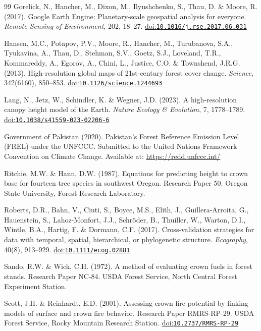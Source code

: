 \documentclass[12pt,a4paper,twoside]{article}
\makeatletter
\providecommand{\doi}[1]{%
  \begingroup
  \let\bibinfo\@secondoftwo
  \urlstyle{rm}%
  \href{https://doi.org/#1}{doi:\nolinkurl{#1}}%
  \endgroup
}
\makeatother
\begin{document}
\begin{thebibliography}{99}
Gorelick, N., Hancher, M., Dixon, M., Ilyushchenko, S., Thau, D. \& Moore, R.
  (2017).
\newblock Google Earth Engine: Planetary-scale geospatial analysis for everyone.
\newblock \textit{Remote Sensing of Environment}, 202, 18--27.
\newblock \doi{10.1016/j.rse.2017.06.031}

Hansen, M.C., Potapov, P.V., Moore, R., Hancher, M., Turubanova, S.A.,
  Tyukavina, A., Thau, D., Stehman, S.V., Goetz, S.J., Loveland, T.R.,
  Kommareddy, A., Egorov, A., Chini, L., Justice, C.O. \& Townshend, J.R.G.
  (2013).
\newblock High-resolution global maps of 21st-century forest cover change.
\newblock \textit{Science}, 342(6160), 850--853.
\newblock \doi{10.1126/science.1244693}

Lang, N., Jetz, W., Schindler, K. \& Wegner, J.D. (2023).
\newblock A high-resolution canopy height model of the Earth.
\newblock \textit{Nature Ecology \& Evolution}, 7, 1778--1789.
\newblock \doi{10.1038/s41559-023-02206-6}

Government of Pakistan (2020).
\newblock Pakistan's Forest Reference Emission Level (FREL) under the UNFCCC.
\newblock Submitted to the United Nations Framework Convention on Climate Change.
\newblock Available at: \url{https://redd.unfccc.int/}

Ritchie, M.W. \& Hann, D.W. (1987).
\newblock Equations for predicting height to crown base for fourteen tree
  species in southwest Oregon.
\newblock Research Paper 50. Oregon State University, Forest Research Laboratory.

Roberts, D.R., Bahn, V., Ciuti, S., Boyce, M.S., Elith, J., Guillera-Arroita,
  G., Hauenstein, S., Lahoz-Monfort, J.J., Schr\"oder, B., Thuiller, W.,
  Warton, D.I., Wintle, B.A., Hartig, F. \& Dormann, C.F. (2017).
\newblock Cross-validation strategies for data with temporal, spatial,
  hierarchical, or phylogenetic structure.
\newblock \textit{Ecography}, 40(8), 913--929.
\newblock \doi{10.1111/ecog.02881}

Sando, R.W. \& Wick, C.H. (1972).
\newblock A method of evaluating crown fuels in forest stands.
\newblock Research Paper NC-84. USDA Forest Service, North Central Forest
  Experiment Station.

Scott, J.H. \& Reinhardt, E.D. (2001).
\newblock Assessing crown fire potential by linking models of surface and crown
  fire behavior.
\newblock Research Paper RMRS-RP-29. USDA Forest Service, Rocky Mountain
  Research Station.
\newblock \doi{10.2737/RMRS-RP-29}


\end{thebibliography}
\end{document}
